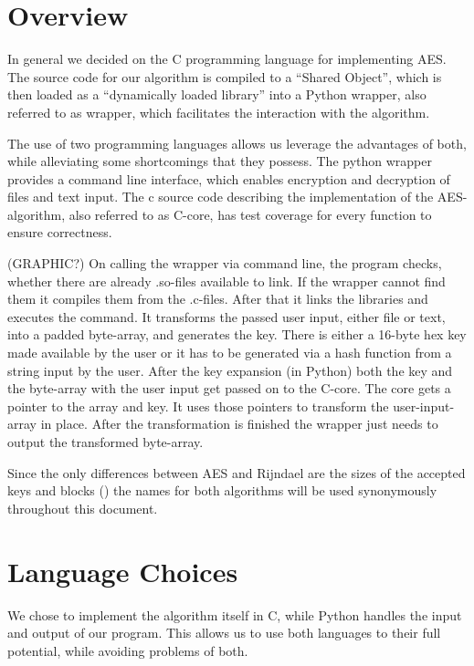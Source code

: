 \hypertarget{overview}{%
\section{Overview}\label{overview}}

In general we decided on the C programming language for implementing
AES. The source code for our algorithm is compiled to a ``Shared
Object'', which is then loaded as a ``dynamically loaded library'' into
a Python wrapper, also referred to as wrapper, which facilitates the
interaction with the algorithm.

The use of two programming languages allows us leverage the advantages
of both, while alleviating some shortcomings that they possess. The
python wrapper provides a command line interface, which enables
encryption and decryption of files and text input. The c source code
describing the implementation of the AES-algorithm, also referred to as
C-core, has test coverage for every function to ensure correctness.

(GRAPHIC?) On calling the wrapper via command line, the program checks,
whether there are already .so-files available to link. If the wrapper
cannot find them it compiles them from the .c-files. After that it links
the libraries and executes the command. It transforms the passed user
input, either file or text, into a padded byte-array, and generates the
key. There is either a 16-byte hex key made available by the user or it
has to be generated via a hash function from a string input by the user.
After the key expansion (in Python) both the key and the byte-array with
the user input get passed on to the C-core. The core gets a pointer to
the array and key. It uses those pointers to transform the
user-input-array in place. After the transformation is finished the
wrapper just needs to output the transformed byte-array.

Since the only differences between AES and Rijndael are the sizes of the
accepted keys and blocks (\cite[p. 31]{rijndael}) the names for both algorithms
will be used synonymously throughout this document.

\hypertarget{language-choices}{%
\section{Language Choices}\label{language-choices}}

We chose to implement the algorithm itself in C, while Python handles
the input and output of our program. This allows us to use both
languages to their full potential, while avoiding problems of both.

